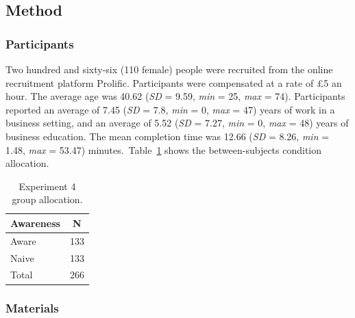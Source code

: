 \documentclass[a4paper, nobind, dvipsnames]{templates/ociamthesis}
\theoremstyle{definition}
\theoremstyle{definition}
\theoremstyle{definition}
\theoremstyle{definition}
\theoremstyle{remark}
\begin{document}
\hypertarget{method-9}{%
\subsection{Method}\label{method-9}}

\hypertarget{participants-10}{%
\subsubsection{Participants}\label{participants-10}}

Two hundred and sixty-six (110 female) people were recruited from the online recruitment platform Prolific. Participants were compensated at a rate of £5 an hour. The average age was 40.62 (\emph{SD} = 9.59, \emph{min} = 25, \emph{max} = 74). Participants reported an average of 7.45 (\emph{SD} = 7.8, \emph{min} = 0, \emph{max} = 47) years of work in a business setting, and an average of 5.52 (\emph{SD} = 7.27, \emph{min} = 0, \emph{max} = 48) years of business education. The mean completion time was 12.66 (\emph{SD} = 8.26, \emph{min} = 1.48, \emph{max} = 53.47) minutes.~Table~\ref{tab:condition-allocation-aggregation-4}
shows the between-subjects condition allocation.

\begin{table}[tbp]

\begin{center}
\begin{threeparttable}

\caption{\label{tab:condition-allocation-aggregation-4}Experiment 4 group allocation.}

\begin{tabular}{ll}
\toprule
Awareness & \multicolumn{1}{c}{N}\\
\midrule
Aware & 133\\
Naive & 133\\
Total & 266\\
\bottomrule
\end{tabular}

\end{threeparttable}
\end{center}

\end{table}

\hypertarget{materials-8}{%
\subsubsection{Materials}\label{materials-8}}
\end{document}
